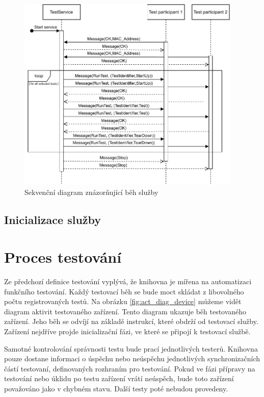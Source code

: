 \begin{figure}[htbp]
    \centering 
    \includegraphics[width=0.95\textwidth]{assets/img/sequencediagram.pdf}
    \caption{Sekvenční diagram znázorňující běh služby}
    \label{fig:seqdiag}
\end{figure}

\subsection{Inicializace služby}



\section{Proces testování}

Ze předchozí definice testování vyplývá, že knihovna je mířena na automatizaci funkčního testování. Každý testovací běh se bude moct skládat z libovolného počtu registrovaných testů. Na obrázku \ref{fig:act_diag_device} můžeme vidět diagram aktivit testovaného zařízení. Tento diagram ukazuje běh testovaného zařízení. Jeho běh se odvíjí na základě instrukcí, které obdrží od testovací služby. Zařízení nejdříve projde inicializační fázi, ve které se připojí k testovací službě. 


Samotné kontrolování správnosti testu bude prací jednotlivých testerů. Knihovna pouze dostane informaci o úspěchu nebo neúspěchu jednotlivých synchronizačních částí testovaní, definovaných rozhraním pro testování. Pokud ve fázi přípravy na testování nebo úklidu po testu zařízení vrátí neúspěch, bude toto zařízení považováno jako v chybném stavu. Další testy poté nebudou provedeny. 

